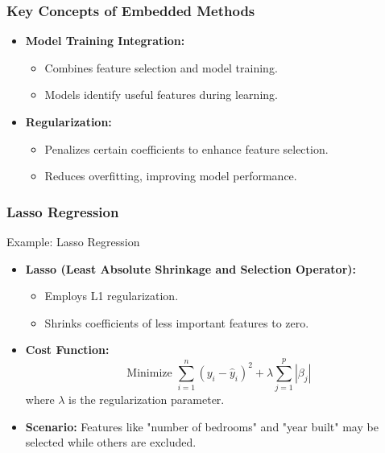 \documentclass[aspectratio=169]{beamer}
\begin{document}
\begin{frame}[fragile]
    \frametitle{Key Concepts of Embedded Methods}
    \begin{itemize}
        \item \textbf{Model Training Integration:} 
            \begin{itemize}
                \item Combines feature selection and model training.
                \item Models identify useful features during learning.
            \end{itemize}
        \item \textbf{Regularization:} 
            \begin{itemize}
                \item Penalizes certain coefficients to enhance feature selection.
                \item Reduces overfitting, improving model performance.
            \end{itemize}
    \end{itemize}
\end{frame}

\begin{frame}[fragile]
    \frametitle{Lasso Regression}
    \begin{block}{Example: Lasso Regression}
        \begin{itemize}
            \item \textbf{Lasso (Least Absolute Shrinkage and Selection Operator):} 
            \begin{itemize}
                \item Employs L1 regularization.
                \item Shrinks coefficients of less important features to zero.
            \end{itemize}
            \item \textbf{Cost Function:}
            \begin{equation}
              \text{Minimize } \sum_{i=1}^{n} (y_i - \hat{y}_i)^2 + \lambda \sum_{j=1}^{p} |\beta_j|
            \end{equation}
            where \( \lambda \) is the regularization parameter.
            \item \textbf{Scenario:} Features like "number of bedrooms" and "year built" may be selected while others are excluded.
        \end{itemize}
    \end{block}
\end{frame}
\end{document}
